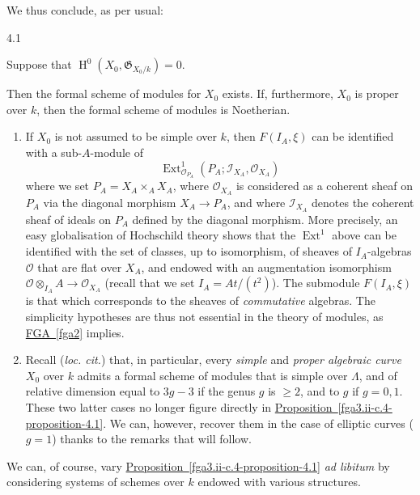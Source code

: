   We thus conclude, as per usual:\begin{proposition}{4.1}\label{fga3.ii-c.4-proposition-4.1}\skipsinglepar\par{}Suppose that \(\operatorname {H}^0(X_0,\mathfrak {G}_{X_0/k})=0\).
    
    Then the formal scheme of modules for \(X_0\) exists.
    If, furthermore, \(X_0\) is proper over \(k\), then the formal scheme of modules is Noetherian.\end{proposition}\begin{remarks}{}\label{fga3.ii-c.4-remarks}\skipsinglepar\begin{enumerate}\item{}If \(X_0\) is not assumed to be simple over \(k\), then \(F(I_A,\xi )\) can be identified with a sub-\(A\)-module of
      \[         \operatorname {Ext}_{\mathscr {O}_{P_A}}^1(P_A;\mathscr {I}_{X_A},\mathscr {O}_{X_A})       \]
      where we set \(P_A=X_A\times _A X_A\), where \(\mathscr {O}_{X_A}\) is considered as a coherent sheaf on \(P_A\) via the diagonal morphism \(X_A\to  P_A\), and where \(\mathscr {I}_{X_A}\) denotes the coherent sheaf of ideals on \(P_A\) defined by the diagonal morphism.
      More precisely, an easy globalisation of Hochschild theory shows that the \(\operatorname {Ext}^1\) above can be identified with the set of classes, up to isomorphism, of sheaves of \(I_A\)-algebras \(\mathscr {O}\) that are flat over \(X_A\), and endowed with an augmentation isomorphism \(\mathscr {O}\otimes _{I_A}A\to \mathscr {O}_{X_A}\) (recall that we set \(I_A=At/(t^2)\)).
      The submodule \(F(I_A,\xi )\) is that which corresponds to the sheaves of \emph{commutative} algebras.
      The simplicity hypotheses are thus not essential in the theory of modules, as \hyperref[fga2]{FGA~\ref*{fga2}} implies.

    \item{}Recall (\emph{loc. cit.}) that, in particular, every \emph{simple} and \emph{proper algebraic curve} \(X_0\) over \(k\) admits a formal scheme of modules that is simple over \(\Lambda \), and of relative dimension equal to \(3g-3\) if the genus \(g\) is \(\geqslant 2\), and to \(g\) if \(g=0,1\).
      These two latter cases no longer figure directly in \hyperref[fga3.ii-c.4-proposition-4.1]{Proposition~\ref*{fga3.ii-c.4-proposition-4.1}}.
      We can, however, recover them in the case of elliptic curves (\(g=1\)) thanks to the remarks that will follow.\end{enumerate}\end{remarks}\par{}We can, of course, vary \hyperref[fga3.ii-c.4-proposition-4.1]{Proposition~\ref*{fga3.ii-c.4-proposition-4.1}} \emph{ad libitum} by considering systems of schemes over \(k\) endowed with various structures.
